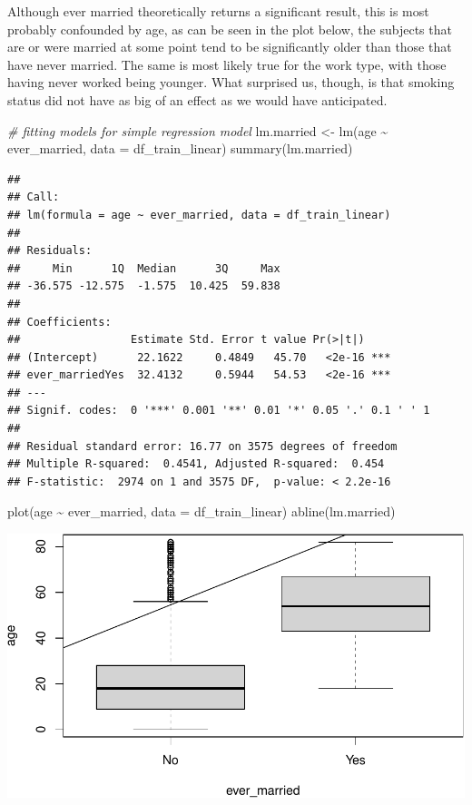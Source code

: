 \documentclass[
]{article}
\newenvironment{Shaded}{\begin{snugshade}}{\end{snugshade}}
\newcommand{\AttributeTok}[1]{\textcolor[rgb]{0.77,0.63,0.00}{#1}}
\newcommand{\CommentTok}[1]{\textcolor[rgb]{0.56,0.35,0.01}{\textit{#1}}}
\newcommand{\FunctionTok}[1]{\textcolor[rgb]{0.00,0.00,0.00}{#1}}
\newcommand{\NormalTok}[1]{#1}
\newcommand{\OtherTok}[1]{\textcolor[rgb]{0.56,0.35,0.01}{#1}}
\newcommand{\SpecialCharTok}[1]{\textcolor[rgb]{0.00,0.00,0.00}{#1}}
\renewcommand{\=}[1]{\stackrel{#1}{=}}
\theoremstyle{definition}
\theoremstyle{remark}
\begin{document}
Although ever married theoretically returns a significant result, this is most probably confounded by age, as can be seen in the plot below, the subjects that are or were married at some point tend to be significantly older than those that have never married.
The same is most likely true for the work type, with those having never worked being younger. What surprised us, though, is that smoking status did not have as big of an effect as we would have anticipated.

\begin{Shaded}
\begin{Highlighting}[]
\CommentTok{\# fitting models for simple regression model}
\NormalTok{lm.married }\OtherTok{\textless{}{-}} \FunctionTok{lm}\NormalTok{(age }\SpecialCharTok{\textasciitilde{}}\NormalTok{ ever\_married, }\AttributeTok{data =}\NormalTok{ df\_train\_linear)}
\FunctionTok{summary}\NormalTok{(lm.married)}
\end{Highlighting}
\end{Shaded}

\begin{verbatim}
## 
## Call:
## lm(formula = age ~ ever_married, data = df_train_linear)
## 
## Residuals:
##     Min      1Q  Median      3Q     Max 
## -36.575 -12.575  -1.575  10.425  59.838 
## 
## Coefficients:
##                 Estimate Std. Error t value Pr(>|t|)    
## (Intercept)      22.1622     0.4849   45.70   <2e-16 ***
## ever_marriedYes  32.4132     0.5944   54.53   <2e-16 ***
## ---
## Signif. codes:  0 '***' 0.001 '**' 0.01 '*' 0.05 '.' 0.1 ' ' 1
## 
## Residual standard error: 16.77 on 3575 degrees of freedom
## Multiple R-squared:  0.4541, Adjusted R-squared:  0.454 
## F-statistic:  2974 on 1 and 3575 DF,  p-value: < 2.2e-16
\end{verbatim}

\begin{Shaded}
\begin{Highlighting}[]
\FunctionTok{plot}\NormalTok{(age }\SpecialCharTok{\textasciitilde{}}\NormalTok{ ever\_married, }\AttributeTok{data =}\NormalTok{ df\_train\_linear)}
\FunctionTok{abline}\NormalTok{(lm.married)}
\end{Highlighting}
\end{Shaded}

\includegraphics{sioux_mach_learn_project_files/figure-latex/unnamed-chunk-29-1.pdf}
\end{document}
